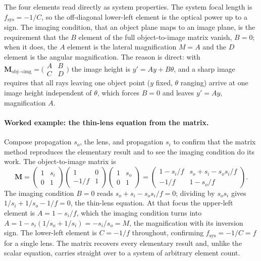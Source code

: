 The four elements read directly as system properties. The system focal length is
$f_{\text{sys}} = -1/C$, so the off-diagonal lower-left element is the optical
power up to a sign. The imaging condition, that an object plane maps to an image
plane, is the requirement that the $B$ element of the full object-to-image matrix
vanish, $B = 0$; when it does, the $A$ element is the lateral magnification
$M = A$ and the $D$ element is the angular magnification. The reason is direct:
with $\mathbf{M}_{\text{obj}\to\text{img}} = \big(\begin{smallmatrix} A & B \\ C
& D\end{smallmatrix}\big)$ the image height is $y' = A y + B\theta$, and a sharp
image requires that all rays leaving one object point ($y$ fixed, $\theta$
ranging) arrive at one image height independent of $\theta$, which forces
$B = 0$ and leaves $y' = A y$, magnification $A$.

\paragraph{Worked example: the thin-lens equation from the matrix.} Compose
propagation $s_o$, the lens, and propagation $s_i$ to confirm that the matrix
method reproduces the elementary result and to see the imaging condition do its
work. The object-to-image matrix is
\[
\mathbf{M} = \begin{pmatrix} 1 & s_i \\ 0 & 1\end{pmatrix}
\begin{pmatrix} 1 & 0 \\ -1/f & 1\end{pmatrix}
\begin{pmatrix} 1 & s_o \\ 0 & 1\end{pmatrix}
= \begin{pmatrix} 1 - s_i/f & s_o + s_i - s_o s_i/f \\
-1/f & 1 - s_o/f \end{pmatrix}.
\]
The imaging condition $B = 0$ reads $s_o + s_i - s_o s_i/f = 0$; dividing by
$s_o s_i$ gives $1/s_i + 1/s_o - 1/f = 0$, the thin-lens equation. At that
focus the upper-left element is $A = 1 - s_i/f$, which the imaging condition
turns into $A = 1 - s_i(1/s_o + 1/s_i) = -s_i/s_o = M$, the magnification with
its inversion sign. The lower-left element is $C = -1/f$ throughout, confirming
$f_{\text{sys}} = -1/C = f$ for a single lens. The matrix recovers every
elementary result and, unlike the scalar equation, carries straight over to a
system of arbitrary element count.

